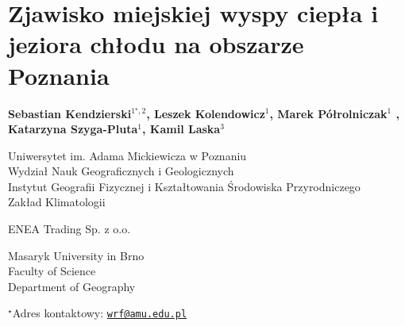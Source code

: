 \documentclass[\main/boa.tex]{subfiles}
\begin{document}
\section{Zjawisko miejskiej wyspy ciepła i jeziora chłodu na obszarze Poznania}

\begin{center}
  {\bf  {} Sebastian Kendzierski$^{1^\star,2}$,  Leszek Kolendowicz$^{1}$,  Marek Półrolniczak$^{1}$ ,  Katarzyna Szyga-Pluta$^{1}$,   Kamil Laska$^{3}$}
\end{center}

\vskip 0.3cm

\begin{affiliations}
\begin{enumerate}
\begin{minipage}{0.915\textwidth}
\centering
\item Uniwersytet im. Adama Mickiewicza w Poznaniu \\ Wydział Nauk Geograficznych i Geologicznych  \\ Instytut Geografii Fizycznej i Kształtowania Środowiska Przyrodniczego\\
Zakład Klimatologii \\[-2pt]
\item ENEA Trading Sp. z o.o.
\item Masaryk University in Brno \\ Faculty of Science\\ Department of Geography
\end{minipage}
\end{enumerate}
$^\star$Adres kontaktowy: \href{mailto:wrf@amu.edu.pl}{\nolinkurl{wrf@amu.edu.pl}}\\
\end{affiliations}

\vskip 0.5cm


\vskip 0.5cm
\end{document}
